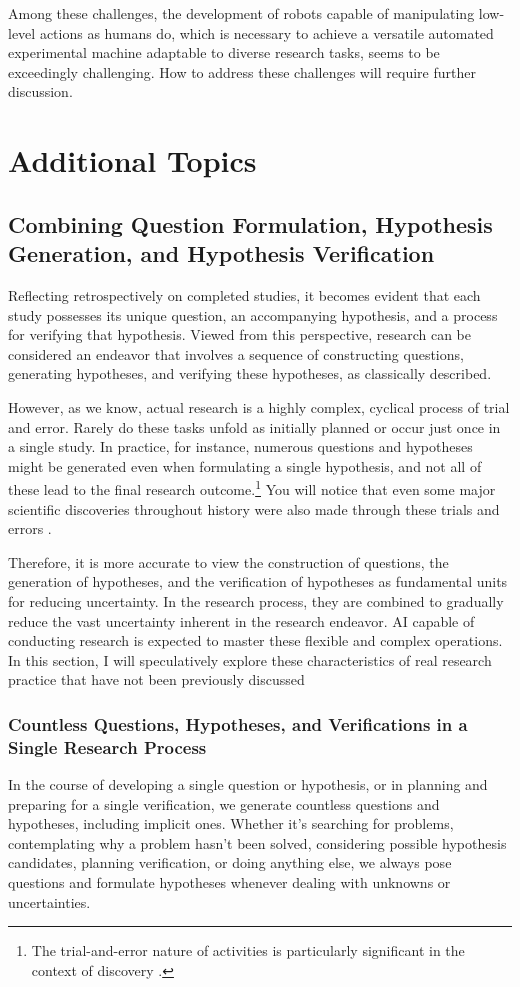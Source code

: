 \documentclass{article}
\begin{document}
Among these challenges, the development of robots capable of manipulating low-level actions as humans do, which is necessary to achieve a versatile automated experimental machine adaptable to diverse research tasks, seems to be exceedingly challenging. How to address these challenges will require further discussion.

\section{Additional Topics}

\subsection{Combining Question Formulation, Hypothesis Generation, and Hypothesis Verification}
Reflecting retrospectively on completed studies, it becomes evident that each study possesses its unique question, an accompanying hypothesis, and a process for verifying that hypothesis. Viewed from this perspective, research can be considered an endeavor that involves a sequence of constructing questions, generating hypotheses, and verifying these hypotheses, as classically described.

However, as we know, actual research is a highly complex, cyclical process of trial and error. Rarely do these tasks unfold as initially planned or occur just once in a single study. In practice, for instance, numerous questions and hypotheses might be generated even when formulating a single hypothesis, and not all of these lead to the final research outcome.\footnote{
The trial-and-error nature of activities is particularly significant in the context of discovery \cite{yanai2020hypothesis}.
} You will notice that even some major scientific discoveries throughout history were also made through these trials and errors \cite{hanson1965patterns,gribbin2022origin,whiteside1970before}.

Therefore, it is more accurate to view the construction of questions, the generation of hypotheses, and the verification of hypotheses as fundamental units for reducing uncertainty. In the research process, they are combined to gradually reduce the vast uncertainty inherent in the research endeavor. AI capable of conducting research is expected to master these flexible and complex operations. In this section, I will speculatively explore these characteristics of real research practice that have not been previously discussed

\subsubsection{Countless Questions, Hypotheses, and Verifications in a Single Research Process}
In the course of developing a single question or hypothesis, or in planning and preparing for a single verification, we generate countless questions and hypotheses, including implicit ones. Whether it's searching for problems, contemplating why a problem hasn't been solved, considering possible hypothesis candidates, planning verification, or doing anything else, we always pose questions and formulate hypotheses whenever dealing with unknowns or uncertainties. 
\end{document}
